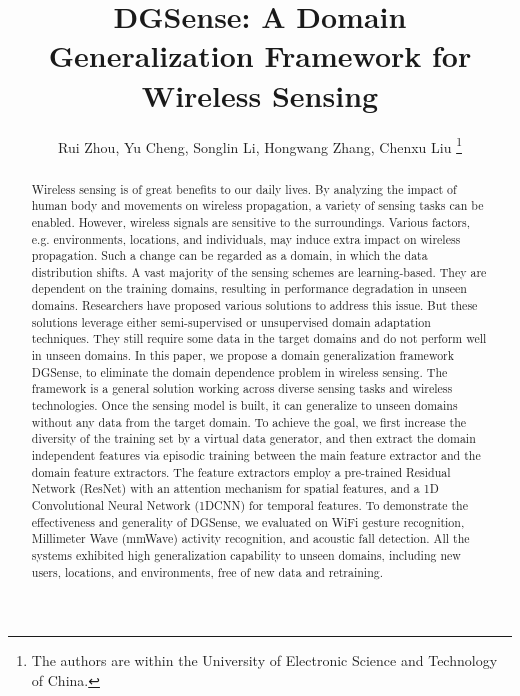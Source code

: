 \documentclass[journal]{IEEEtran}
\begin{document}
\title{DGSense: A Domain Generalization Framework for Wireless Sensing}


\author{Rui Zhou, Yu Cheng, Songlin Li, Hongwang Zhang, Chenxu Liu
\thanks{The authors are within the University of Electronic Science and Technology of China.}}

\maketitle

\begin{abstract}
Wireless sensing is of great benefits to our daily lives. By analyzing the impact of human body and movements on wireless propagation, a variety of sensing tasks can be enabled. However, wireless signals are sensitive to the surroundings. Various factors, e.g. environments, locations, and individuals, may induce extra impact on wireless propagation. Such a change can be regarded as a domain, in which the data distribution shifts. A vast majority of the sensing schemes are learning-based. They are dependent on the training domains, resulting in performance degradation in unseen domains. Researchers have proposed various solutions to address this issue. But these solutions leverage either semi-supervised or unsupervised domain adaptation techniques. They still require some data in the target domains and do not perform well in unseen domains. In this paper, we propose a domain generalization framework DGSense, to eliminate the domain dependence problem in wireless sensing. The framework is a general solution working across diverse sensing tasks and wireless technologies. Once the sensing model is built, it can generalize to unseen domains without any data from the target domain. To achieve the goal, we first increase the diversity of the training set by a virtual data generator, and then extract the domain independent features via episodic training between the main feature extractor and the domain feature extractors. The feature extractors employ a pre-trained Residual Network (ResNet) with an attention mechanism for spatial features, and a 1D Convolutional Neural Network (1DCNN) for temporal features. To demonstrate the effectiveness and generality of DGSense, we evaluated on WiFi gesture recognition, Millimeter Wave (mmWave) activity recognition, and acoustic fall detection. All the systems exhibited high generalization capability to unseen domains, including new users, locations, and environments, free of new data and retraining. 
\end{abstract}
\end{document}
